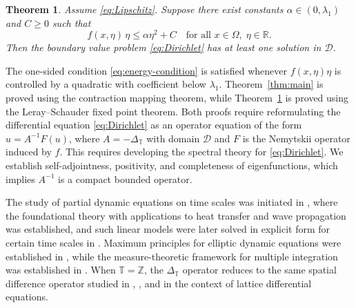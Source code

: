 \documentclass{article}
\newtheorem{theorem}{Theorem}[section]
\numberwithin{equation}{section}
\numberwithin{theorem}{section}
\begin{document}
\begin{theorem}\label{thm:global}
Assume \eqref{eq:Lipschitz}. Suppose there exist constants
$\alpha \in (0, \lambda_1)$ and $C \geq 0$ such that
\begin{equation}\label{eq:energy-condition}
f(x, \eta)\,\eta \leq \alpha \eta^2 + C \quad \text{for all }
x \in \Omega,\; \eta \in \mathbb{R}.
\end{equation}
Then the boundary value problem \eqref{eq:Dirichlet} has at least one
solution in $\mathscr{D}$.
\end{theorem}

The one-sided condition \eqref{eq:energy-condition} is satisfied
whenever $f(x,\eta)\eta$ is controlled by a quadratic with coefficient
below $\lambda_1$.
Theorem~\ref{thm:main} is proved using the contraction mapping theorem, while 
Theorem~\ref{thm:global} is proved using the Leray--Schauder fixed point theorem. Both proofs require reformulating the differential equation \eqref{eq:Dirichlet} as an operator equation of the form $u = A^{-1}F(u)$, where $A = -\Delta_{\mathbb{T}}$ with domain $\mathscr{D}$ and $F$ is the Nemytskii operator induced by $f$. This requires developing the spectral theory for \eqref{eq:Dirichlet}. We establish self-adjointness, positivity, and completeness of eigenfunctions, which implies $A^{-1}$ is a compact bounded operator.

The study of partial dynamic equations on time scales was initiated in \cite{Billy, Billy-Thesis}, where the foundational theory with applications to heat transfer and wave propagation was established, and such linear models were later solved in explicit form for certain time scales in \cite{theots}. Maximum principles for elliptic dynamic equations were established in \cite{Stehlik-2010, Stehlik-Thompson}, while the measure-theoretic framework for multiple integration was established in \cite{Bohner-Guseinov-Multiple, Bohner-Guseinov-Lebesgue}. When $\mathbb{T}=\mathbb{Z}$, the $\Delta_{\mathbb{T}}$ operator reduces to the same spatial difference operator studied in \cite {Billy-Thesis, bavsic2024discrete}, \cite[(1.2)]{slavik2018discrete}, and \cite[(1.1)]{slavik2014explicit} in the context of lattice differential equations. 
\end{document}
